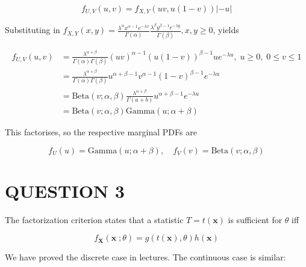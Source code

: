\documentclass[a4paper]{article}
\begin{document}
	\[ f_{U,V}(u,v) = f_{X,Y}(uv,u(1-v))\left| -u \right|  \]
	
	Substituting in $ f_{X,Y}(x,y) = \frac{\lambda^{\alpha} x^{\alpha - 1} e^{-\lambda x}}{\Gamma(\alpha)} \frac{\lambda^{\beta} y^{\beta - 1} e^{-\lambda y}}{\Gamma(\beta)}, x,y \geq 0  $, yields
	
	\begin{align*}
	f_{U,V}(u,v) & = \frac{\lambda^{\alpha + \beta}}{\Gamma(\alpha) \Gamma(\beta)} (uv)^{\alpha - 1}(u(1-v))^{\beta - 1}  u e^{-\lambda u}, \; u \geq 0, \;  0 \leq v \leq 1 \\
	& = \frac{\lambda^{\alpha + \beta}}{\Gamma(\alpha) \Gamma(\beta)} u^{\alpha + \beta - 1} v^{\alpha - 1} (1-v)^{\beta - 1} e^{-\lambda u} \\
	& = \text{Beta}(v ; \alpha,\beta) \frac{\lambda^{\alpha + \beta}}{\Gamma(a+b)} u^{\alpha + \beta - 1} e^{-\lambda u} \\
	& = \text{Beta}(v ; \alpha,\beta) \text{Gamma}(u ; \alpha + \beta)
	\end{align*}
	
	This factorises, so the respective marginal PDFs are
	
	\[ f_{U}(u) = \text{Gamma}(u ; \alpha + \beta), \quad f_{V}(v) = \text{Beta}(v ; \alpha,\beta)  \]

	
	



\section{QUESTION 3}

The factorization criterion states that a statistic $ T = t(\mathbf{x}) $ is sufficient for $ \theta $ iff 

\[ f_{\mathbf{X}}(\mathbf{x} \; ; \theta) = g(t(\mathbf{x}), \theta) h(\mathbf{x}) \]

We have proved the discrete case in lectures. The continuous case is similar:
\end{document}
